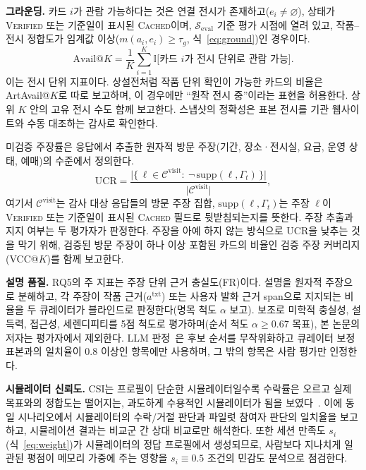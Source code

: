 \documentclass[10pt,twocolumn,letterpaper]{article}
\newcommand{\cS}{\mathcal{S}}
\begin{document}
\textbf{그라운딩.} 카드 $i$가 관람 가능하다는 것은 연결 전시가 존재하고($e_i\ne\varnothing$), 상태가 \textsc{Verified} 또는 기준일이 표시된 \textsc{Cached}이며, $\cS_{\mathrm{eval}}$ 기준 평가 시점에 열려 있고, 작품–전시 정합도가 임계값 이상($m(a_i,e_i)\ge\tau_g$, 식~\eqref{eq:ground})인 경우이다.
\begin{equation}
\mathrm{Avail@}K=\frac{1}{K}\sum_{i=1}^{K}\mathbb{I}\bigl[\text{카드 }i\text{가 전시 단위로 관람 가능}\bigr].
\label{eq:avail}
\end{equation}
이는 전시 단위 지표이다. 상설전처럼 작품 단위 확인이 가능한 카드의 비율은 ArtAvail@$K$로 따로 보고하며, 이 경우에만 ``원작 전시 중''이라는 표현을 허용한다. 상위 $K$ 안의 고유 전시 수도 함께 보고한다. 스냅샷의 정확성은 표본 전시를 기관 웹사이트와 수동 대조하는 감사로 확인한다.

미검증 주장률은 응답에서 추출한 원자적 방문 주장(기간, 장소·전시실, 요금, 운영 상태, 예매)의 수준에서 정의한다.
\begin{equation}
\mathrm{UCR}=\frac{\bigl|\{\,\ell\in\mathcal{C}^{\mathrm{visit}}:\ \neg\,\mathrm{supp}(\ell,\Gamma_t)\,\}\bigr|}{\bigl|\mathcal{C}^{\mathrm{visit}}\bigr|},
\label{eq:ucr}
\end{equation}
여기서 $\mathcal{C}^{\mathrm{visit}}$는 감사 대상 응답들의 방문 주장 집합, $\mathrm{supp}(\ell,\Gamma_t)$는 주장 $\ell$이 \textsc{Verified} 또는 기준일이 표시된 \textsc{Cached} 필드로 뒷받침되는지를 뜻한다. 주장 추출과 지지 여부는 두 평가자가 판정한다. 주장을 아예 하지 않는 방식으로 UCR을 낮추는 것을 막기 위해, 검증된 방문 주장이 하나 이상 포함된 카드의 비율인 검증 주장 커버리지(VCC@$K$)를 함께 보고한다.

\textbf{설명 품질.} RQ5의 주 지표는 주장 단위 근거 충실도(FR)이다. 설명을 원자적 주장으로 분해하고, 각 주장이 작품 근거($a^{\mathrm{txt}}$) 또는 사용자 발화 근거 span으로 지지되는 비율을 두 큐레이터가 블라인드로 판정한다(명목 척도 $\alpha$ 보고). 보조로 미학적 충실성, 설득력, 접근성, 세렌디피티를 5점 척도로 평가하며(순서 척도 $\alpha\ge0.67$ 목표), 본 논문의 저자는 평가자에서 제외한다. LLM 판정~\cite{zheng2023judge}은 후보 순서를 무작위화하고 큐레이터 보정 표본과의 일치율이 0.8 이상인 항목에만 사용하며, 그 밖의 항목은 사람 평가만 인정한다.

\textbf{시뮬레이터 신뢰도.} CSI는 프로필이 단순한 시뮬레이터일수록 수락률은 오르고 실제 목표와의 정합도는 떨어지는, 과도하게 수용적인 시뮬레이터가 됨을 보였다~\cite{kim2025csi}. 이에 동일 시나리오에서 시뮬레이터의 수락/거절 판단과 파일럿 참여자 판단의 일치율을 보고하고, 시뮬레이션 결과는 비교군 간 상대 비교로만 해석한다. 또한 세션 만족도 $s_i$(식~\eqref{eq:weight})가 시뮬레이터의 정답 프로필에서 생성되므로, 사람보다 지나치게 일관된 평점이 메모리 가중에 주는 영향을 $s_i\equiv0.5$ 조건의 민감도 분석으로 점검한다.
\end{document}
